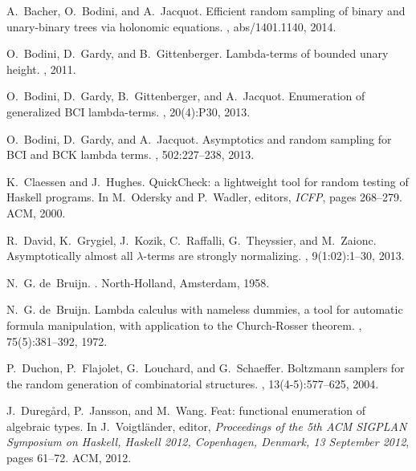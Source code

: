 \documentclass{sig-alternate}
\begin{document}
\begin{thebibliography}{10}

A.~Bacher, O.~Bodini, and A.~Jacquot.
\newblock Efficient random sampling of binary and unary-binary trees via
  holonomic equations.
, abs/1401.1140, 2014.

O.~Bodini, D.~Gardy, and B.~Gittenberger.
\newblock Lambda-terms of bounded unary height.
, 2011.

O.~Bodini, D.~Gardy, B.~Gittenberger, and A.~Jacquot.
\newblock Enumeration of generalized {BCI} lambda-terms.
, 20(4):P30, 2013.

O.~Bodini, D.~Gardy, and A.~Jacquot.
\newblock Asymptotics and random sampling for {BCI} and {BCK} lambda terms.
, 502:227--238, 2013.

K.~Claessen and J.~Hughes.
\newblock \textsf{QuickCheck}: a lightweight tool for random testing of
  \textsf{Haskell} programs.
\newblock In M.~Odersky and P.~Wadler, editors, {\em ICFP}, pages 268--279.
  ACM, 2000.

R.~David, K.~Grygiel, J.~Kozik, C.~Raffalli, G.~Theyssier, and M.~Zaionc.
\newblock Asymptotically almost all $\lambda$-terms are strongly normalizing.
, 9(1:02):1--30, 2013.

N.~G. de~Bruijn.
.
\newblock North-Holland, Amsterdam, 1958.

N.~G. de~Bruijn.
\newblock Lambda calculus with nameless dummies, a tool for automatic formula
  manipulation, with application to the {Church-Rosser} theorem.
,
  75(5):381--392, 1972.

P.~Duchon, P.~Flajolet, G.~Louchard, and G.~Schaeffer.
\newblock Boltzmann samplers for the random generation of combinatorial
  structures.
, 13(4-5):577--625,
  2004.

J.~Dureg{\aa}rd, P.~Jansson, and M.~Wang.
\newblock Feat: functional enumeration of algebraic types.
\newblock In J.~Voigtl{\"a}nder, editor, {\em Proceedings of the 5th {ACM
  SIGPLAN} {Symposium on Haskell, Haskell} 2012, {Copenhagen, Denmark}, 13
  {September} 2012}, pages 61--72. ACM, 2012.


\end{thebibliography}
\end{document}
